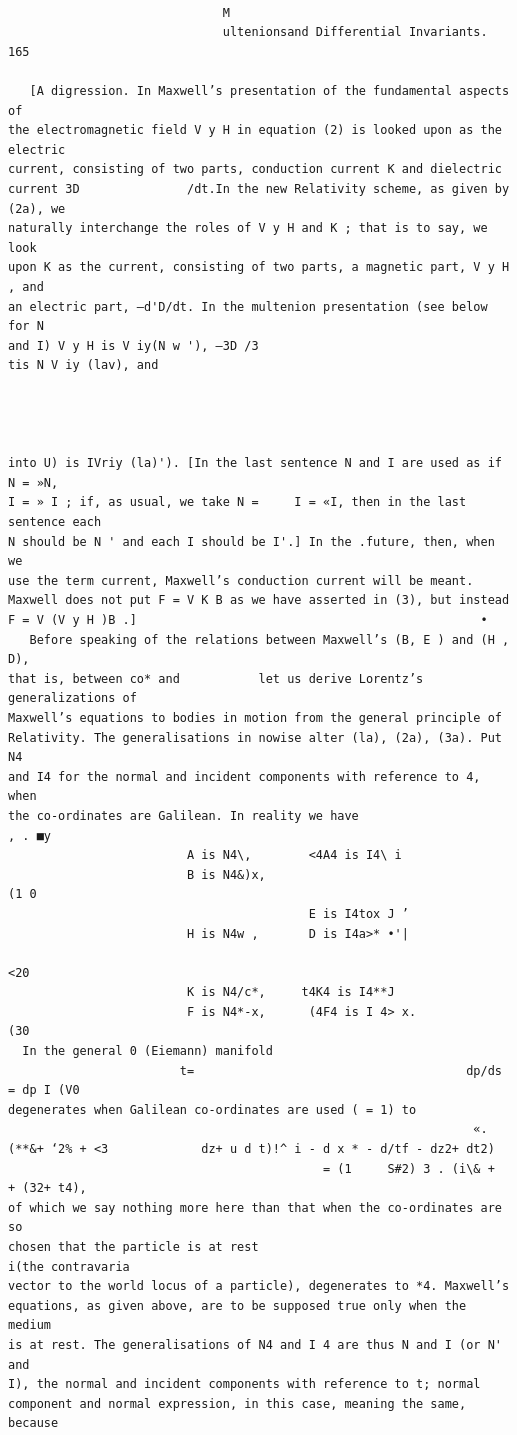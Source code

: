 \documentclass[10pt]{article}
\begin{document}
\clearpage
\begin{verbatim}

                              M
                              ultenionsand Differential Invariants.                165

   [A digression. In Maxwell’s presentation of the fundamental aspects of
the electromagnetic field V y H in equation (2) is looked upon as the electric
current, consisting of two parts, conduction current K and dielectric
current 3D               /dt.In the new Relativity scheme, as given by (2a), we
naturally interchange the roles of V y H and K ; that is to say, we look
upon K as the current, consisting of two parts, a magnetic part, V y H , and
an electric part, —d'D/dt. In the multenion presentation (see below for N
and I) V y H is V iy(N w '), —3D /3                                     tis N V iy (lav), and




into U) is IVriy (la)'). [In the last sentence N and I are used as if N = »N,
I = » I ; if, as usual, we take N =     I = «I, then in the last sentence each
N should be N ' and each I should be I'.] In the .future, then, when we
use the term current, Maxwell’s conduction current will be meant.
Maxwell does not put F = V K B as we have asserted in (3), but instead
F = V (V y H )B .]                                                •
   Before speaking of the relations between Maxwell’s (B, E ) and (H , D),
that is, between co* and           let us derive Lorentz’s generalizations of
Maxwell’s equations to bodies in motion from the general principle of
Relativity. The generalisations in nowise alter (la), (2a), (3a). Put N4
and I4 for the normal and incident components with reference to 4, when
the co-ordinates are Galilean. In reality we have                     , . ■y
                         A is N4\,        <4A4 is I4\ i
                         B is N4&)x,                                               (1 0
                                          E is I4tox J ’
                         H is N4w ,       D is I4a>* •'|
                                                                                   <20
                         K is N4/c*,     t4K4 is I4**J
                         F is N4*-x,      (4F4 is I 4> x.                          (30
  In the general 0 (Eiemann) manifold
                        t=                                      dp/ds = dp I (V0
degenerates when Galilean co-ordinates are used ( = 1) to
                                                                 «.         (**&+ ‘2% + <3             dz+ u d t)!^ i - d x * - d/tf - dz2+ dt2)
                                            = (1     S#2) 3 . (i\& +     + (32+ t4),
of which we say nothing more here than that when the co-ordinates are so
chosen that the particle is at rest                                    i(the contravaria
vector to the world locus of a particle), degenerates to *4. Maxwell’s
equations, as given above, are to be supposed true only when the medium
is at rest. The generalisations of N4 and I 4 are thus N and I (or N' and
I), the normal and incident components with reference to t; normal
component and normal expression, in this case, meaning the same, because


\end{verbatim}
\end{document}
